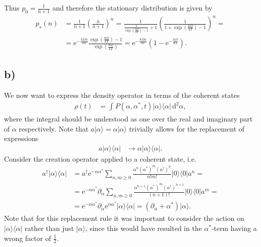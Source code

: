 \documentclass[english, parskip=full]{scrartcl}
\newcommand{\intx}{}
\newcommand{\kla}{}
\newcommand{\oper}{}
\newcommand{\Ket}{}
\newcommand{\e}{\text{e}}
\begin{document}
Thus $p_0 = \frac{1}{\bar{n} + 1}$ and therefore the stationary distribution is given by
\begin{align}
p_s (n) &= \frac{1}{\bar{n} + 1}\kla\left( \frac{\bar{n}}{\bar{n} + 1} \right)^n = \frac{1}{\frac{1}{\exp\kla\left( \frac{\hbar\Omega}{kT} \right) - 1} + 1}\kla\left( \frac{1}{1 + \exp\kla\left( \frac{\hbar\Omega}{kT} \right) - 1}\right)^n = \\
&= \e^{-\frac{\hbar\Omega n}{kT}} \frac{\exp\kla\left( \frac{\hbar\Omega}{kT} \right) - 1}{\exp\kla\left( \frac{\hbar\Omega}{kT} \right)} = \e^{-\frac{\hbar\Omega n}{kT}} \kla\left( 1 - \e^{-\frac{\hbar\Omega}{kT}} \right).
\end{align}

\subsection*{b)}
We now want to express the density operator in terms of the coherent states
\begin{align}
\rho(t) &= \intx\int_{ }^{ } P(\alpha,\alpha^\ast,t)\oper | \alpha \rangle\langle \alpha | \, \mathrm{d}^2\alpha,
\end{align}
where the integral should be understood as one over the real and imaginary part of $\alpha$ respectively.
Note that $a\Ket | \alpha \rangle = \alpha\Ket | \alpha \rangle$ trivially allows for the replacement of expressions
\begin{align}
a\oper | \alpha \rangle\langle \alpha  |&\rightarrow \alpha\oper | \alpha \rangle\langle \alpha |.
\end{align}
Consider the creation operator applied to a coherent state, i.e.
\begin{align}
a^\dagger\Ket | \alpha  \rangle \langle \alpha  | &= a^\dagger \e^{-\alpha\alpha^\ast} \sum_{n,m\ge 0} \frac{\alpha^n(\alpha^\ast)^m \kla\left( a^\dagger \right)^n}{n!m!}\Ket | 0 \rangle \langle 0  | a^n = \\
&= \e^{-\alpha\alpha^\ast} \partial_\alpha \sum_{n,m\ge 0} \frac{\alpha^{n+1}(\alpha^\ast)^m \kla\left( a^\dagger \right)^{n+1}}{(n+1)!} \Ket | 0 \rangle \langle 0  | a^m = \\
&= \e^{-\alpha\alpha^\ast} \partial_\alpha \e^{\alpha\alpha^\ast} \Ket | \alpha \rangle \langle \alpha  | = \kla\left( \partial_\alpha + \alpha^\ast \right)\Ket | \alpha \rangle.
\end{align}
Note that for this replacement rule it was important to consider the action on $\oper | \alpha \rangle\langle \alpha |$ rather than just $\Ket | \alpha \rangle$, since this would have resulted in the $\alpha^\ast$-term having a wrong factor of $\frac{1}{2}$.
\end{document}
